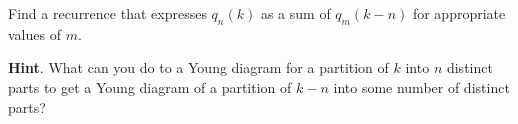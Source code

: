\documentclass{book}
\begin{document}
\setcounter{cpjt}{313}
\addtocounter{cpjt}{-1}
\begin{activity}\label{activity-306}
\hypertarget{p-1548}{}%
Find a recurrence that expresses \(q_n(k)\) as a sum of \(q_m(k-n)\) for appropriate values of \(m\).%
\par\smallskip%
\noindent\textbf{Hint}.\hypertarget{hint-201}{}\quad%
\hypertarget{p-1549}{}%
What can you do to a Young diagram for a partition of \(k\) into \(n\) distinct parts to get a Young diagram of a partition of \(k-n\) into some number of distinct parts?%
\par\smallskip%
\noindent\end{activity}

\clearpage
\end{document}
